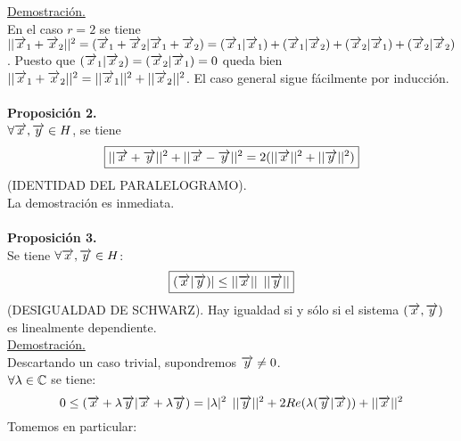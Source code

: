 \underline{Demostración.}\\
En el caso $r=2$ se tiene $|| \overrightarrow{x}_1 + \overrightarrow{x}_2 ||^2 =(\overrightarrow{x}_1+\overrightarrow{x}_2 |\overrightarrow{x}_1+\overrightarrow{x}_2)=(\overrightarrow{x}_1 | \overrightarrow{x}_1)+(\overrightarrow{x}_1 | \overrightarrow{x}_2)+(\overrightarrow{x}_2|\overrightarrow{x}_1)+(\overrightarrow{x}_2 | \overrightarrow{x}_2)$. Puesto que $(\overrightarrow{x}_1 | \overrightarrow{x}_2)=(\overrightarrow{x}_2 | \overrightarrow{x}_1)=0$ queda bien $|| \overrightarrow{x}_1 + \overrightarrow{x}_2 ||^2 = || \overrightarrow{x}_1 ||^2+|| \overrightarrow{x}_2 ||^2$. El caso general sigue fácilmente por inducción. \\ \\
\textbf{Proposición 2.} \\
$\forall \overrightarrow{x}, \overrightarrow{y} \in H$, se tiene 
\begin{equation*}
\boxed{
|| \overrightarrow{x} +\overrightarrow{y} ||^2+ || \overrightarrow{x} -\overrightarrow{y} ||^2 = 2(|| \overrightarrow{x} ||^2 + || \overrightarrow{y}||^2)}
\end{equation*}
(IDENTIDAD DEL PARALELOGRAMO). \\
La demostración es inmediata. \\ \\
\textbf{Proposición 3.} \\ 
Se tiene $\forall \overrightarrow{x}, \overrightarrow{y} \in H$: 
\begin{equation*}
\boxed{(\overrightarrow{x} | \overrightarrow{y} )| \leq || \overrightarrow{x} || \phantom{s} || \overrightarrow{y} ||}
\end{equation*}
(DESIGUALDAD DE SCHWARZ).
Hay igualdad si y sólo si el sistema $(\overrightarrow{x}, \overrightarrow{y})$ es linealmente dependiente. \\
\underline{Demostración.}\\
Descartando un caso trivial, supondremos $\overrightarrow{y} \neq 0$.\\
$\forall \lambda \in \mathbb{C}$ se tiene: 
\begin{equation}
0 \leq (\overrightarrow{x} + \lambda \overrightarrow{y} | \overrightarrow{x} +\lambda \overrightarrow{y})=| \lambda|^2 \phantom{s} || \overrightarrow{y} ||^2 + 2 Re(\lambda (\overrightarrow{y} | \overrightarrow{x} ))+ || \overrightarrow{x} ||^2
\end{equation}
Tomemos en particular:

